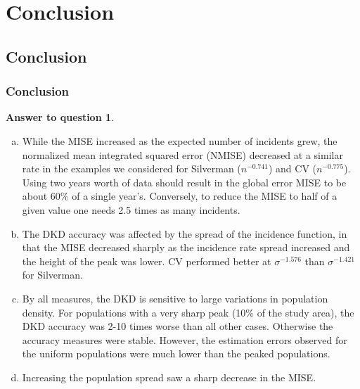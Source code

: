 \documentclass[notheorems]{beamer}
\theoremstyle{definition}
\newtheorem{answer}{Answer to question}
\theoremstyle{example}
\begin{document}
\section{Conclusion}

\subsection{Conclusion}
\begin{frame}\frametitle{Conclusion}
    \footnotesize
    \begin{answer}
        \begin{enumerate}[a)]
            \item
                While the MISE increased as the expected number of incidents grew,
                the normalized mean integrated squared error (NMISE) decreased at a similar rate in the examples we considered
                for Silverman ($n^{-0.741}$) and CV ($n^{-0.775}$).
                Using two years worth of data should result in the global error MISE to be about 60\% of a single year's.
                Conversely, to reduce the MISE to half of a given value one needs 2.5 times as many incidents.
            \item
                The DKD accuracy was affected by the spread of the incidence function,
                in that the MISE decreased sharply as the incidence rate spread increased and the height of the peak was lower.
                CV performed better at $\sigma^{-1.576}$ than $\sigma^{-1.421}$ for Silverman.
            \item
                By all measures, the DKD is sensitive to large variations in population density.
                For populations with a very sharp peak (10\% of the study area),
                the DKD accuracy was 2-10 times worse than all other cases.
                Otherwise the accuracy measures were stable.
                However, the estimation errors observed for the uniform populations were much lower than the peaked populations.
            \item
                Increasing the population spread saw a sharp decrease in the MISE.
        \end{enumerate}
    \end{answer}
\end{frame}

\end{document}
